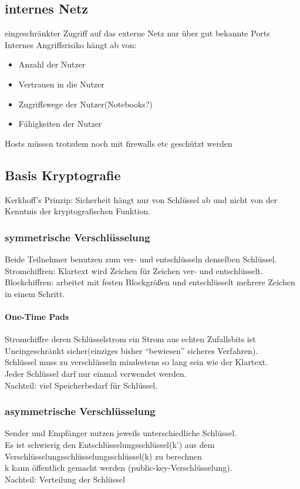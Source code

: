 \documentclass{article} %
\begin{document}
\subsection{internes Netz}
eingeschränkter Zugriff auf das externe Netz nur über gut bekannte Ports\\
Internes Angriffsrisiko hängt ab von:
\begin{itemize}
	\item Anzahl der Nutzer
    \item Vertrauen in die Nutzer
    \item Zugriffswege der Nutzer(Notebooks?)
    \item Fähigkeiten der Nutzer
\end{itemize}
Hosts müssen trotzdem noch mit firewalls etc geschützt werden
\subsection{Basis Kryptografie}
Kerkhoff's Prinzip: Sicherheit hängt nur von Schlüssel ab und nicht von der Kenntnis der kryptografischen Funktion.\\
\subsubsection{symmetrische Verschlüsselung}
Beide Teilnehmer benutzen zum ver- und entschlüsseln denselben Schlüssel.\\
Stromchiffren: Klartext wird Zeichen für Zeichen ver- und entschlüsselt.\\
Blockchiffren: arbeitet mit festen Blockgrößen und entschlüsselt mehrere Zeichen in einem Schritt.\\
\paragraph{One-Time Pads}
Stromchiffre deren Schlüsselstrom ein Strom aus echten Zufallsbits ist\\
Uneingeschränkt sicher(einziges bisher "`bewiesen"' sicheres Verfahren).\\
Schlüssel muss zu verschlüsseln mindestens so lang sein wie der Klartext.\\
Jeder Schlüssel darf nur einmal verwendet werden.\\
Nachteil: viel Speicherbedarf für Schlüssel.\\
\subsubsection{asymmetrische Verschlüsselung}
Sender und Empfänger nutzen jeweils unterschiedliche Schlüssel.\\
Es ist schwierig den Entschlüsselungsschlüssel(k') aus dem Verschlüsselungsschlüsselungsschlüssel(k) zu berechnen\\
k kann öffentlich gemacht werden (public-key-Verschlüsselung).\\
Nachteil: Verteilung der Schlüssel\\
\end{document}

